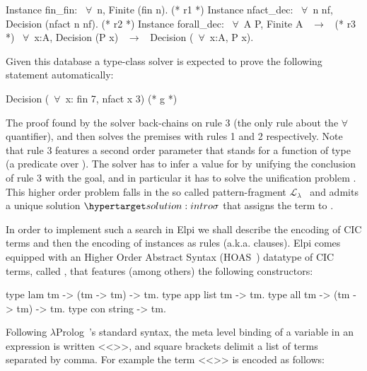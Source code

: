 \documentclass[sigconf,natbib=false,review]{acmart}
\newcommand{\llambda}{\ensuremath{\mathcal{L}_\lambda}\xspace}
\begin{document}
\begin{coqcode}
Instance fin_fin: ~$\forall$~n, Finite (fin n).             (* r1 *)
Instance nfact_dec: ~$\forall$~n nf, Decision (nfact n nf). (* r2 *)
Instance forall_dec: ~$\forall$~A P, Finite A ~$\to$~            (* r3 *)
  ~$\forall$~x:A, Decision (P x) ~$\to$~ Decision (~$\forall$~x:A, P x).
\end{coqcode}

\noindent Given this database a type-class solver is expected to
prove the following statement automatically:

\begin{coqcode}
  Decision (~$\forall$~x: fin 7, nfact x 3)                   (* g *)
\end{coqcode}

\noindent
The proof found by the solver back-chains on rule 3 (the only rule
about the $\forall$ quantifier), and then solves the premises with
rules 1 and 2 respectively.
Note that rule 3 features a second order parameter  that stands for
a function of type  (a predicate over ).
The solver has to infer a value for  by unifying the conclusion
of rule 3 with the goal, and in particular it has to solve the unification
problem . This higher order problem falls in the so
called pattern-fragment \llambda~\cite{miller92jsc} and admits a unique
solution $\customlabel{solution:intro}{\sigma}$ that assigns
the term  to .

In order to implement such a search in Elpi we shall describe the encoding
of CIC terms and then the encoding of instances as rules (a.k.a. clauses).
Elpi comes equipped with
an Higher Order Abstract Syntax (HOAS~\cite{10.1145/53990.54010}) datatype of CIC
terms, called , that features (among others) the following
constructors:

\begin{elpicode}
type lam  tm -> (tm -> tm) -> tm.     %
type app  list tm -> tm.              %
type all  tm -> (tm -> tm) -> tm.     %
type con  string -> tm.               %
\end{elpicode}

\noindent
Following $\lambda$Prolog~\cite{miller_nadathur_2012}'s standard syntax,
the meta level binding of a variable  in an expression
 is written <<>>, and square brackets delimit a
list of terms separated by comma. For example the term
<<>> is encoded as follows:
\end{document}
